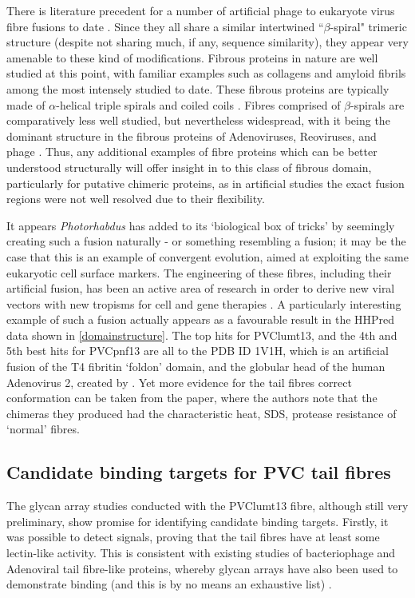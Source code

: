 There is literature precedent for a number of artificial phage to eukaryote virus fibre fusions to date \citep{Papanikolopoulou2004a, Papanikolopoulou2004, Krasnykh2001}. Since they all share a similar intertwined ``$\beta$-spiral" trimeric structure (despite not sharing much, if any, sequence similarity), they appear very amenable to these kind of modifications. Fibrous proteins in nature are well studied at this point, with familiar examples such as collagens and amyloid fibrils among the most intensely studied to date. These fibrous proteins are typically made of $\alpha$-helical triple spirals and coiled coils \citep{Beck1998}. Fibres comprised of $\beta$-spirals are comparatively less well studied, but nevertheless widespread, with it being the dominant structure in the fibrous proteins of Adenoviruses, Reoviruses, and phage \citep{Papanikolopoulou2004a, Papanikolopoulou2004b}. Thus, any additional examples of fibre proteins which can be better understood structurally will offer insight in to this class of fibrous domain, particularly for putative chimeric proteins, as in artificial studies the exact fusion regions were not well resolved due to their flexibility.

It appears \emph{Photorhabdus} has added to its `biological box of tricks' by seemingly creating such a fusion naturally - or something resembling a fusion; it may be the case that this is an example of convergent evolution, aimed at exploiting the same eukaryotic cell surface markers. The engineering of these fibres, including their artificial fusion, has been an active area of research in order to derive new viral vectors with new tropisms for cell and gene therapies \citep{Krasnykh2001, Li2006}. A particularly interesting example of such a fusion actually appears as a favourable result in the HHPred data shown in \vref{domainstructure}. The top hits for PVClumt13, and the 4th and 5th best hits for PVCpnf13 are all to the PDB ID 1V1H, which is an artificial fusion of the T4 fibritin `foldon' domain, and the globular head of the human Adenovirus 2, created by \cite{Papanikolopoulou2004}. Yet more evidence for the tail fibres correct conformation can be taken from the paper, where the authors note that the chimeras they produced had the characteristic heat, SDS, protease resistance of `normal' fibres.


\subsection{Candidate binding targets for PVC tail fibres}
The glycan array studies conducted with the PVClumt13 fibre, although still very preliminary, show promise for identifying candidate binding targets. Firstly, it was possible to detect signals, proving that the tail fibres have at least some lectin-like activity. This is consistent with existing studies of bacteriophage and Adenoviral tail fibre-like proteins, whereby glycan arrays have also been used to demonstrate binding (and this is by no means an exhaustive list) \citep{Guardado-Calvo2010, Singh2015, Lenman2018, Nilsson2011}.

